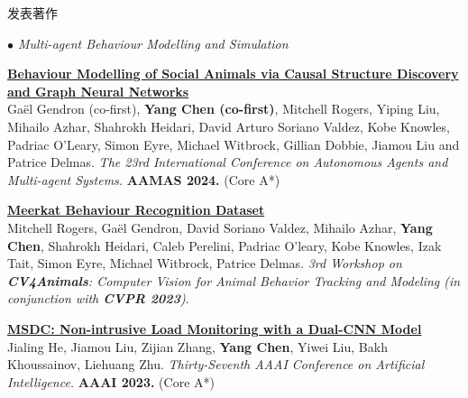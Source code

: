 \documentclass{resume} %
\begin{document}
\begin{rSection}{发表著作}
\begin{rSubsection}{\large\em $\bullet$ Multi-agent Behaviour Modelling and Simulation}{}{}{}
	\item {\href{https://arxiv.org/abs/2312.14333}{\bf Behaviour Modelling of Social Animals via Causal Structure Discovery and Graph Neural Networks}}\\
		Ga\"el Gendron (co-first), \textbf{Yang Chen (co-first)}, Mitchell Rogers, Yiping Liu, Mihailo Azhar, Shahrokh Heidari, David Arturo Soriano Valdez, Kobe Knowles, Padriac O'Leary, Simon Eyre, Michael Witbrock, Gillian Dobbie, Jiamou Liu and Patrice Delmas. {\em  The 23rd International Conference on Autonomous Agents and Multi-agent Systems.} \textbf{AAMAS 2024.} (Core A*)\\
	\item {\href{https://arxiv.org/abs/2306.11326}{\bf Meerkat Behaviour Recognition Dataset}}\\Mitchell Rogers, Gaël Gendron, David Soriano Valdez, Mihailo Azhar, \textbf{Yang Chen}, Shahrokh Heidari, Caleb Perelini, Padriac O'leary, Kobe Knowles, Izak Tait, Simon Eyre, Michael Witbrock, Patrice Delmas. {\em 3rd Workshop on {\bf CV4Animals}: Computer Vision for Animal Behavior Tracking and Modeling (in conjunction with {\bf CVPR 2023})}.\\
	\item {
	\href{https://ojs.aaai.org/index.php/AAAI/article/download/25636/25408}{\bf MSDC: Non-intrusive Load Monitoring with a Dual-CNN Model}}\\
		Jialing He, Jiamou Liu, Zijian Zhang, \textbf{Yang Chen}, Yiwei Liu, Bakh Khoussainov, Liehuang Zhu. {\em Thirty-Seventh AAAI Conference on Artificial Intelligence.} \textbf{AAAI 2023.} (Core A*)\\
\end{rSubsection}


\end{rSection}
\end{document}
